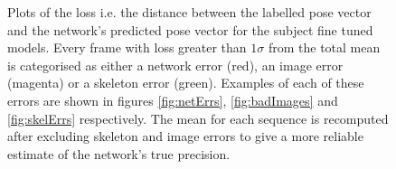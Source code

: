 \documentclass[11pt]{article} %
\begin{document}
\begin{figure}
\ContinuedFloat
\centering
%
\qquad
{}%
\caption{Plots of the loss i.e. the distance between the labelled pose vector and the network's predicted pose vector for the subject fine tuned models. Every frame with loss greater than $1\sigma$ from the total mean is categorised as either a network error (red), an image error (magenta) or a skeleton error (green). Examples of each of these errors are shown in figures \ref{fig:netErrs}, \ref{fig:badImages} and \ref{fig:skelErrs} respectively. The mean for each sequence is recomputed after excluding skeleton and image errors to give a more reliable estimate of the network's true precision. }
\label{fig:classedErr}
\end{figure}
\end{document}
